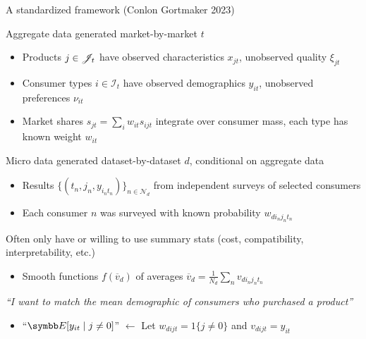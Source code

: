 \documentclass[aspectratio=169,10pt]{beamer}
\begin{document}
\begin{frame}[label=framework]{A standardized framework (Conlon Gortmaker 2023)}
    \begin{wideitemize}
        
        \item Aggregate data generated market-by-market $t$
        \begin{itemize}
            \item \alert{Products} $j \in \mathscr{J}_t$ have observed characteristics $x_{jt}$, unobserved quality $\xi_{jt}$
            \item \alert{Consumer types} $i \in \mathcal{I}_t$ have observed demographics $y_{it}$, unobserved preferences $\nu_{it}$
            \item \alert{Market shares} $s_{jt} = \sum_i w_{it} s_{ijt}$ integrate over consumer mass, each type has known weight $w_{it}$
        \end{itemize}
        
        \item Micro data generated dataset-by-dataset $d$, conditional on aggregate data
        \begin{itemize}
            \item Results $\{(t_n, j_n, y_{i_nt_n})\}_{n \in \mathcal{N}_d}$ from \alert{independent surveys} of \alert{selected consumers}
            \item Each consumer $n$ was surveyed with known probability $w_{di_nj_nt_n}$
        \end{itemize}
        
        \item Often only have or willing to use \alert{summary stats} (cost, compatibility, interpretability, etc.)
        \begin{itemize}
            \item Smooth functions $f(\overline{v}_d)$ of averages $\overline{v}_d = \frac{1}{N_d} \sum_n v_{di_nj_nt_n}$
        \end{itemize}
        
        \item \textit{``I want to match the mean demographic of consumers who purchased a product''}
        \begin{itemize}
            \item ``$\E[y_{it} \mid j \neq 0]$'' $\leftarrow$ Let $w_{dijt} = 1\{j \neq 0\}$ and $v_{dijt} = y_{it}$
        \end{itemize}
    \end{wideitemize}
\end{frame}
\end{document}
